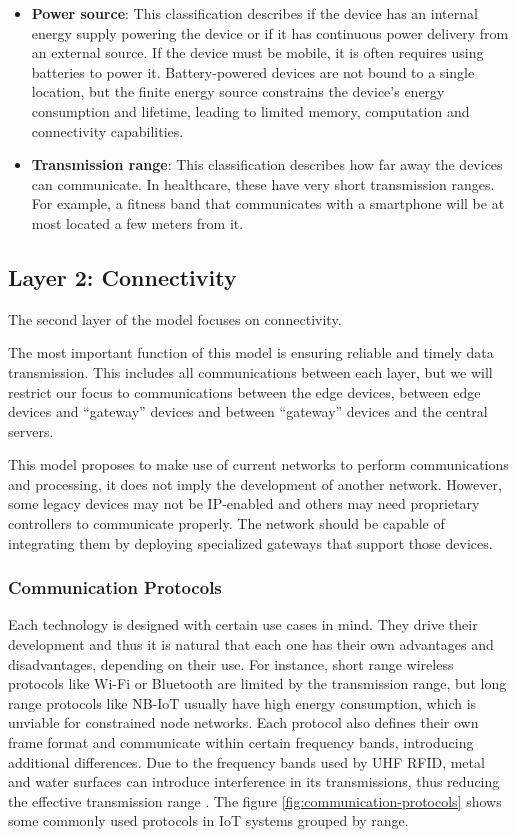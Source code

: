 \begin{itemize}
    \item \textbf{Power source}: This classification describes if the device has an internal energy supply powering the device or if it has continuous power delivery from an external source. If the device must be mobile, it is often requires using batteries to power it. Battery-powered devices are not bound to a single location, but the finite energy source constrains the device's energy consumption and lifetime, leading to limited memory, computation and connectivity capabilities. 
    \item \textbf{Transmission range}: This classification describes how far away the devices can communicate. In healthcare, these have very short transmission ranges. For example, a fitness band that communicates with a smartphone will be at most located a few meters from it.
\end{itemize}


\subsection{Layer 2: Connectivity}
\label{sec:iot-model-layer2}

The second layer of the model focuses on connectivity. 

The most important function of this model is ensuring reliable and timely data transmission. This includes all communications between each layer, but we will restrict our focus to communications between the edge devices, between edge devices and ``gateway'' devices and between ``gateway'' devices and the central servers.\bigskip

This model proposes to make use of current networks to perform communications and processing, it does not imply the development of another network. However, some legacy devices may not be IP-enabled and others may need proprietary controllers to communicate properly. The network should be capable of integrating them by deploying specialized gateways that support those devices.

\subsubsection{Communication Protocols}
Each technology is designed with certain use cases in mind. They drive their development and thus it is natural that each one has their own advantages and disadvantages, depending on their use. For instance, short range wireless protocols like Wi-Fi or Bluetooth are limited by the transmission range, but long range protocols like NB-IoT usually have high energy consumption, which is unviable for constrained node networks. Each protocol also defines their own frame format and communicate within certain frequency bands, introducing additional differences. Due to the frequency bands used by UHF \acs{RFID}, metal and water surfaces can introduce interference in its transmissions, thus reducing the effective transmission range \cite{Cairo2018}. The figure \ref{fig:communication-protocols} shows some commonly used protocols in \acs{IoT} systems grouped by range. 

